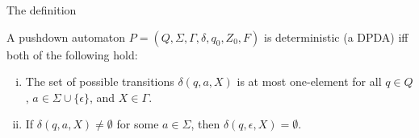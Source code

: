 \documentclass[handout]{beamer}
\begin{document}
\begin{frame}{The definition}

    \begin{definition}
        A pushdown automaton $P=(Q,\Sigma,\Gamma,\delta,q_0,Z_0,F)$ is \alert{deterministic} (a \alert{DPDA}) iff both of the following hold:
        \begin{enumerate}[(i)]
            \item The set of possible transitions $\delta(q,a,X)$ is at most one-element for all  $q\in Q$, $a\in\Sigma \cup \{\epsilon\}$, and $X\in\Gamma$.
            \item If $\delta(q,a,X)\neq\emptyset$ for some $a\in \Sigma$, then $\delta(q,\epsilon,X)=\emptyset$.
        \end{enumerate}
    \end{definition}

\end{frame}
\end{document}
